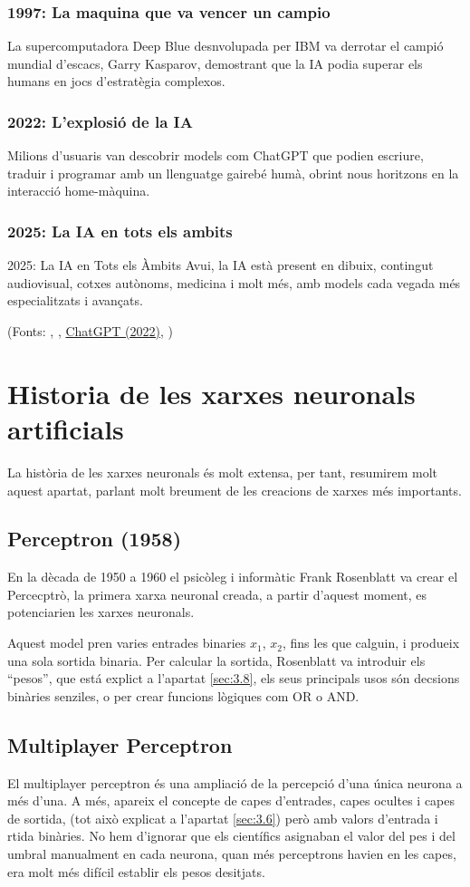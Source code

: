 \subsubsection{1997: La maquina que va vencer un campio}
 La supercomputadora Deep Blue desnvolupada per IBM va derrotar el campió mundial d’escacs, Garry Kasparov, demostrant que la IA podia superar els humans en jocs d’estratègia complexos.
\subsubsection{2022: L'explosió de la IA}
Milions d’usuaris van descobrir models com ChatGPT que podien escriure, traduir i programar amb un llenguatge gairebé humà, obrint nous horitzons en la interacció home-màquina.
\subsubsection{2025: La IA en tots els ambits}
    2025: La IA en Tots els Àmbits
    Avui, la IA està present en dibuix, contingut audiovisual, cotxes autònoms, medicina i molt més, amb models cada vegada més especialitzats i avançats.



(Fonts: \cite{McCarthy_Minsky_Rochester_Shannon_2006}, \cite{deep-blue},
\href{https://openai.com/index/chatgpt/}{ChatGPT (2022)},
\cite{10.1093/mind/LIX.236.433}
)
\section{Historia de les xarxes neuronals artificials}
La història de les xarxes neuronals és molt extensa, per tant, resumirem molt aquest apartat, parlant molt breument de les creacions de xarxes més importants.
\subsection{Perceptron (1958)}
En la dècada de 1950 a 1960 el psicòleg i informàtic Frank Rosenblatt va crear el Percecptrò, la primera xarxa neuronal creada, a partir d'aquest moment, es potenciarien les xarxes neuronals.

Aquest model pren varies entrades binaries $x_1$, $x_2$, fins les que calguin, i produeix una sola sortida binaria. Per calcular la sortida, Rosenblatt va introduir els ``pesos'', que está explict a l'apartat \ref{sec:3.8}, els seus principals usos són decsions binàries senziles, o per crear funcions lògiques com OR o AND.

\subsection{Multiplayer Perceptron}
El multiplayer perceptron és una ampliació de la percepció d'una única neurona a més d'una. A més, apareix el concepte de capes d'entrades, capes ocultes i capes de sortida, (tot això explicat a l'apartat \ref{sec:3.6}) però amb valors d'entrada i rtida binàries. No hem d'ignorar que els científics asignaban el valor del pes i del umbral manualment en cada neurona, quan més perceptrons havien en les capes, era molt més difícil establir els pesos desitjats.

